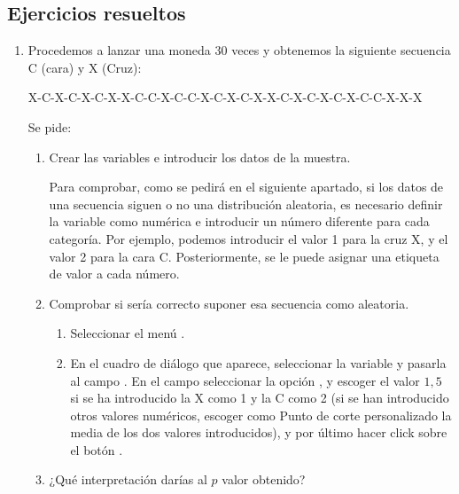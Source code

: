 \begin{description}
\clearpage
\newpage

\section{Ejercicios resueltos}
\begin{enumerate}[leftmargin=*]
\item Procedemos a lanzar una moneda 30 veces y obtenemos la siguiente secuencia C (cara) y X (Cruz):

\begin{center}
X-C-X-C-X-C-X-X-C-C-X-C-C-X-C-X-C-X-X-C-X-C-X-C-X-C-C-X-X-X
\end{center}

Se pide:
\begin{enumerate}
\item Crear las variables  e introducir los datos de la muestra.

\begin{indicacion}
Para comprobar, como se pedirá en el siguiente apartado, si los datos de una secuencia siguen o no una distribución aleatoria, es necesario definir la variable como numérica e introducir un número diferente para cada categoría. Por ejemplo, podemos introducir el valor 1 para la cruz X, y el valor 2 para la cara C. Posteriormente, se le puede asignar una etiqueta de valor a cada número.
\end{indicacion}

\item Comprobar si sería correcto suponer esa secuencia como aleatoria.
\begin{indicacion}
\begin{enumerate}
\item Seleccionar el menú .
\item En el cuadro de diálogo que aparece, seleccionar la variable  y pasarla al campo . En el campo  seleccionar la opción , y escoger el valor $1,5$ si se ha introducido la X como 1 y la C como 2 (si se han introducido otros valores numéricos, escoger como Punto de corte personalizado la media de los dos valores introducidos), y por último hacer click sobre el botón .
\end{enumerate}
\end{indicacion}

\item ¿Qué interpretación darías al $p$ valor obtenido?


\end{enumerate}
\end{enumerate}
\end{description}
